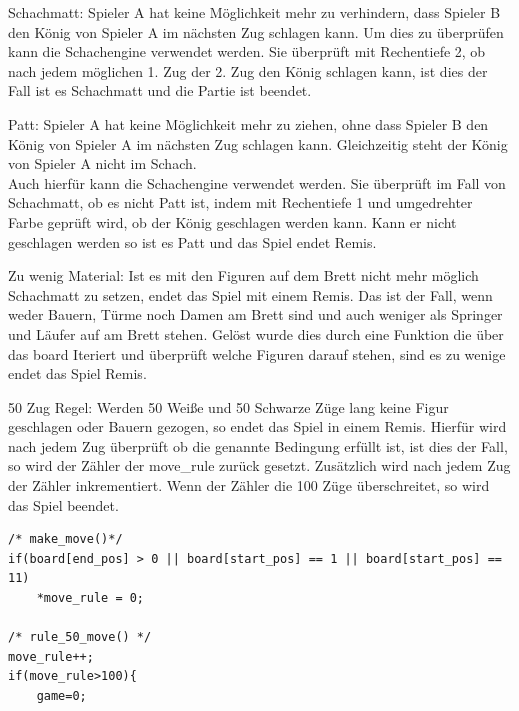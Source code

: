 \documentclass[a4paper, 12pt]{article}
\begin{document}
\begin{compactenum}
\item{Schachmatt: Spieler A hat keine Möglichkeit mehr zu verhindern, dass Spieler B den König von Spieler A im nächsten Zug schlagen kann.
Um dies zu überprüfen kann die Schachengine verwendet werden.
Sie überprüft mit Rechentiefe 2, ob nach jedem möglichen 1. Zug der 2. Zug den König schlagen kann, ist dies der Fall ist es Schachmatt und die Partie ist beendet.}
\item{Patt: Spieler A hat keine Möglichkeit mehr zu ziehen, ohne dass Spieler B den König von Spieler A im nächsten Zug schlagen kann. Gleichzeitig steht der König von Spieler A nicht im Schach.\\
Auch hierfür kann die Schachengine verwendet werden. Sie überprüft im Fall von Schachmatt, ob es nicht Patt ist, indem mit Rechentiefe 1 und umgedrehter Farbe geprüft wird, ob der König geschlagen werden kann. Kann er nicht geschlagen werden so ist es Patt und das Spiel endet Remis.}
\item{Zu wenig Material: Ist es mit den Figuren auf dem Brett nicht mehr möglich Schachmatt zu setzen, endet das Spiel mit einem Remis. Das ist der Fall, wenn weder Bauern, Türme noch Damen am Brett sind und auch weniger als Springer und Läufer auf am Brett stehen.
Gelöst wurde dies durch eine Funktion die über das board Iteriert und überprüft welche Figuren darauf stehen, sind es zu wenige endet das Spiel Remis.}
\item{50 Zug Regel: Werden 50 Weiße und 50 Schwarze Züge lang keine Figur geschlagen oder Bauern gezogen, so endet das Spiel in einem Remis.
Hierfür wird nach jedem Zug überprüft ob die genannte Bedingung erfüllt ist, ist dies der Fall, so wird der Zähler der move\_rule zurück gesetzt. Zusätzlich wird nach jedem Zug der Zähler inkrementiert. Wenn der Zähler die 100 Züge überschreitet, so wird das Spiel beendet.
\begin{lstlisting}
/* make_move()*/
if(board[end_pos] > 0 || board[start_pos] == 1 || board[start_pos] == 11)
	*move_rule = 0;

/* rule_50_move() */
move_rule++;
if(move_rule>100){
	game=0;
\end{lstlisting}
}

\end{compactenum}

\pagebreak
\end{document}

